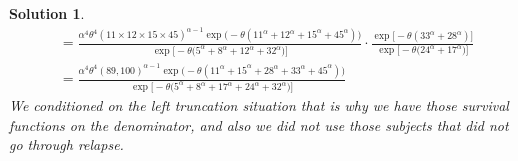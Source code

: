 \documentclass[11pt]{article}
\newtheorem{sol}{Solution}
\begin{document}
\begin{sol}
\begin{align*}
		&=  \frac{\alpha^4\theta^4(11\times 12\times15\times45)^{\alpha - 1}\exp\Big(-\theta(11^{\alpha} + 12^{\alpha} + 15^{\alpha} + 45^{\alpha})\Big)}{\exp\Big[-\theta\Big(5^{\alpha} + 8^{\alpha} + 12^{\alpha} + 32^{\alpha}\Big)\Big]}\cdot \frac{\exp\Big[-\theta(33^{\alpha} + 28^{\alpha})\Big]}{\exp\Big[-\theta\Big(24^{\alpha} + 17^{\alpha}\Big)\Big]}\\
		&= \frac{\alpha^4\theta^4(89,100)^{\alpha - 1}\exp\Big(-\theta(11^{\alpha} + 15^{\alpha} + 28^{\alpha} + 33^{\alpha} + 45^{\alpha})\Big)}{\exp\Big[-\theta\Big(5^{\alpha} + 8^{\alpha} + 17^{\alpha} + 24^{\alpha} + 32^{\alpha}\Big)\Big]}
	\end{align*}
	We conditioned on the left truncation situation that is why we have those survival functions on the denominator, and also we did not use those subjects that did not go through relapse.
\end{sol}
\end{document}
